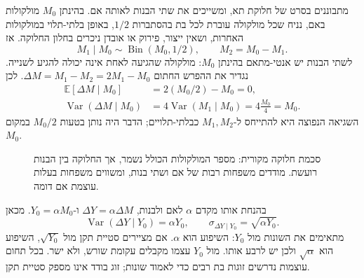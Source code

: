 מתבוננים בסרט של חלוקת תא, ומשייכים את שתי הבנות לאותה אם. בהינתן $M_0$ מולקולות באם, נניח שכל מולקולה עוברת לכל בת בהסתברות $1/2$, באופן בלתי-תלוי במולקולות האחרות, ושאין ייצור, פירוק או אובדן ניכרים בחלון החלוקה. אז
\begin{equation}\label{eq:he03-partition}
M_1\mid M_0\sim\operatorname{Bin}(M_0,1/2),\qquad M_2=M_0-M_1.
\end{equation}
לשתי הבנות יש אנטי-מתאם בהינתן $M_0$: מולקולה שהגיעה לאחת אינה יכולה להגיע לשנייה. נגדיר את ההפרש החתום $\Delta M=M_1-M_2=2M_1-M_0$. לכן
\begin{align}
\mathbb{E}[\Delta M\mid M_0]&=2(M_0/2)-M_0=0,\label{eq:he03-delta-mean}\\
\operatorname{Var}(\Delta M\mid M_0)&=4\operatorname{Var}(M_1\mid M_0)
=4\frac{M_0}{4}=M_0.\label{eq:he03-delta-var}
\end{align}
השגיאה הנפוצה היא להתייחס ל-$M_1,M_2$ כבלתי-תלויים; הדבר היה נותן בטעות $M_0/2$ במקום $M_0$.

\begin{figure}[htbp]
\centering
\begin{english}
\end{english}
\caption{סכמת חלוקה מקורית: מספר המולקולות הכולל נשמר, אך החלוקה בין הבנות רועשת. מודדים משפחות רבות של אם ושתי בנות, ומשווים משפחות בעלות עוצמת אם דומה.}\label{fig:he03-partition}
\end{figure}

בהנחת אותו מקדם $\alpha$ לאם ולבנות, $\Delta Y=\alpha\Delta M$ ו-$Y_0=\alpha M_0$. מכאן
\begin{equation}\label{eq:he03-calibration}
\boxed{\operatorname{Var}(\Delta Y\mid Y_0)=\alpha Y_0},\qquad
\boxed{\sigma_{\Delta Y\mid Y_0}=\sqrt{\alpha Y_0}}.
\end{equation}
מתאימים את השונות מול $Y_0$: השיפוע הוא $\alpha$. אם מציירים סטיית תקן מול $\sqrt{Y_0}$, השיפוע הוא $\sqrt\alpha$ ולכן יש לרבע אותו. מול $Y_0$ עצמו מקבלים עקומת שורש, ולא ישר. בכל תחום עוצמות נדרשים זוגות בת רבים כדי לאמוד שונות; זוג בודד אינו מספק סטיית תקן.

